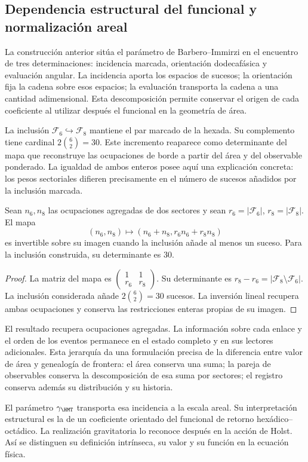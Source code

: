 \subsection{Dependencia estructural del funcional y normalización areal}

La construcción anterior sitúa el parámetro de Barbero--Immirzi en el
encuentro de tres determinaciones: incidencia marcada, orientación
dodecafásica y evaluación angular. La incidencia aporta los espacios
de sucesos; la orientación fija la cadena sobre esos espacios; la
evaluación transporta la cadena a una cantidad adimensional. Esta
descomposición permite conservar el origen de cada coeficiente al
utilizar después el funcional en la geometría de área.

La inclusión \(\mathcal F_6\hookrightarrow\mathcal F_8\) mantiene
el par marcado de la hexada. Su complemento tiene cardinal
\(2\binom62=30\). Este incremento reaparece como determinante del
mapa que reconstruye las ocupaciones de borde a partir del área y
del observable ponderado. La igualdad de ambos enteros posee aquí
una explicación concreta: los pesos sectoriales difieren precisamente
en el número de sucesos añadidos por la inclusión marcada.

\begin{proposition}
Sean \(n_6,n_8\) las ocupaciones agregadas de dos sectores y sean
\(r_6=|\mathcal F_6|\), \(r_8=|\mathcal F_8|\). El mapa
\[
 (n_6,n_8)\longmapsto(n_6+n_8,r_6n_6+r_8n_8)
\]
es invertible sobre su imagen cuando la inclusión añade al menos un
suceso. Para la inclusión construida, su determinante es 30.
\end{proposition}
\begin{proof}
La matriz del mapa es
\(\left(\begin{smallmatrix}1&1\\r_6&r_8\end{smallmatrix}\right)\).
Su determinante es \(r_8-r_6=|\mathcal F_8\setminus\mathcal F_6|\).
La inclusión considerada añade \(2\binom62=30\) sucesos. La inversión
lineal recupera ambas ocupaciones y conserva las restricciones enteras
propias de su imagen.
\end{proof}

El resultado recupera ocupaciones agregadas. La información sobre
cada enlace y el orden de los eventos permanece en el estado completo
y en sus lectores adicionales. Esta jerarquía da una formulación
precisa de la diferencia entre valor de área y genealogía de frontera:
el área conserva una suma; la pareja de observables conserva la
descomposición de esa suma por sectores; el registro conserva además
su distribución y su historia.

El parámetro \(\gamma_{\HMT}\) transporta esa incidencia a la escala
areal. Su interpretación estructural es la de un coeficiente orientado
del funcional de retorno hexádico--octádico. La realización gravitatoria
lo reconoce después en la acción de Holst. Así se distinguen su
definición intrínseca, su valor y su función en la ecuación física.
